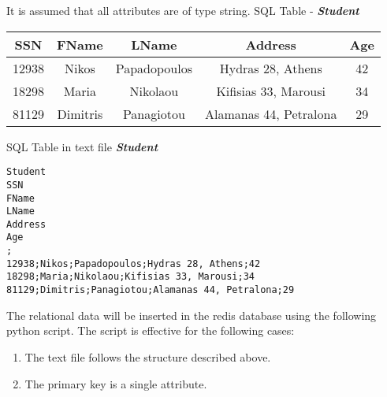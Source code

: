 \documentclass[11pt]{article}
\begin{document}
It is assumed that all attributes are of type string.
\newline\newline
SQL Table - \textbf{\emph{Student}}
\begin{center}
	\begin{tabular}{ ||c c c c c|| } 
		\hline
		SSN   & FName    & LName        & Address                & Age \\ 
		\hline
		12938 & Nikos    & Papadopoulos & Hydras 28, Athens      & 42  \\ 
		\hline
		18298 & Maria    & Nikolaou     & Kifisias 33, Marousi   & 34  \\ 
		\hline
		81129 & Dimitris & Panagiotou   & Alamanas 44, Petralona & 29  \\ 
		\hline
		
	\end{tabular}\newline
\end{center}
\noindent
SQL Table in text file \textbf{\emph{Student}}
\begin{center}
	\begin{verbatim}
Student
SSN
FName
LName
Address
Age
;
12938;Nikos;Papadopoulos;Hydras 28, Athens;42
18298;Maria;Nikolaou;Kifisias 33, Marousi;34
81129;Dimitris;Panagiotou;Alamanas 44, Petralona;29
	\end{verbatim}
\end{center}
\noindent
The relational data will be inserted in the redis database using the following python script. The script is effective for the following cases:
\begin{enumerate}
	\item The text file follows the structure described above.
	\item The primary key is a single attribute.
\end{enumerate}
\end{document}
